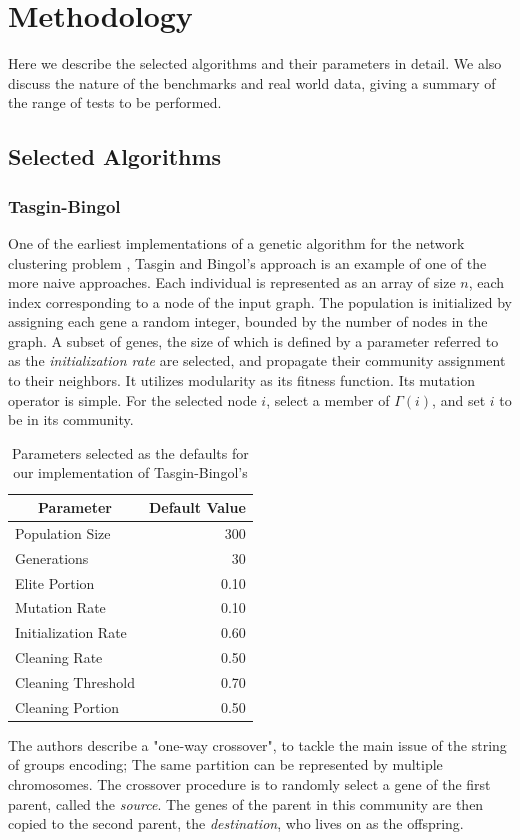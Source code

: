 \chapter{Methodology}
Here we describe the selected algorithms and their parameters in detail. We also discuss the nature of the benchmarks and real world data, giving a summary of the range of tests to be performed. 

\section{Selected Algorithms}
\subsection{Tasgin-Bingol}
One of the earliest implementations of a genetic algorithm for the network clustering problem \cite{Tasgin2006}, Tasgin and Bingol's approach is an example of one of the more naive approaches. Each individual is represented as an array of size $n$, each index corresponding to a node of the input graph. The population is initialized by assigning each gene a random integer, bounded by the number of nodes in the graph. A subset of genes, the size of which is defined by a parameter referred to as the \textit{initialization rate} are selected, and propagate their community assignment to their neighbors. It utilizes modularity as its fitness function. Its mutation operator is simple. For the selected node $i$, select a member of $\Gamma(i)$, and set $i$ to be in its community.

\begin{table}[h!]
	\centering
	\begin{tabular}{|l | r|}
		\hline
		\multicolumn{1}{|c|}{\textbf{Parameter}} & \multicolumn{1}{|c|}{\textbf{Default Value}} \\
		\hline
		\hline
		Population Size & 300 \\
		\hline
		Generations & 30 \\
		\hline
		Elite Portion & 0.10 \\
		\hline
		Mutation Rate  & 0.10 \\
		\hline
		Initialization Rate & 0.60 \\
		\hline
		Cleaning Rate & 0.50 \\
		\hline
		Cleaning Threshold & 0.70 \\
		\hline
		Cleaning Portion & 0.50 \\ [0.2ex] 
		\hline
		
	\end{tabular}
	\caption{Parameters selected as the defaults for our implementation of Tasgin-Bingol's}
	\label{table:tbgadef}
\end{table}
The authors describe a "one-way crossover", to tackle the main issue of the string of groups encoding; The same partition can be represented by multiple chromosomes. The crossover procedure is to randomly select a gene of the first parent, called the \textit{source}. The genes of the parent in this community are then copied to the second parent, the \textit{destination}, who lives on as the offspring.



